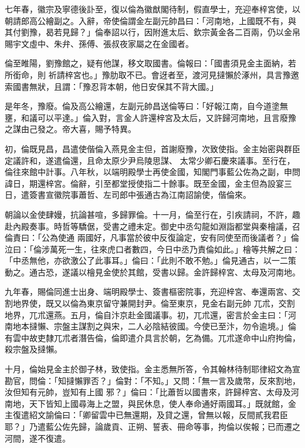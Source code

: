 \begin{pinyinscope}
 七年春，徽宗及寧德後訃至，復以倫為徽猷閣待制，假直學士，充迎奉梓宮使，以朝請郎高公繪副之。入辭，帝使倫謂金左副元帥昌曰：「河南地，上國既不有，與其付劉豫，曷若見歸？」倫奉詔以行，因附進太后、欽宗黃金各二百兩，仍以金帛賜宇文虛中、朱弁、孫傅、張叔夜家屬之在金國者。



 倫至睢陽，劉豫館之，疑有他謀，移文取國書。倫報曰：「國書須見金主面納，若所銜命，則
 祈請梓宮也。」豫肋取不已。會迓者至，渡河見撻懶於涿州，具言豫邀索國書無狀，且謂：「豫忍背本朝，他日安保其不背大國。」



 是年冬，豫廢。倫及高公繪還，左副元帥昌送倫等曰：「好報江南，自今道塗無壅，和議可以平達。」倫入對，言金人許還梓宮及太后，又許歸河南地，且言廢豫之謀由己發之。帝大喜，賜予特異。



 初，倫既見昌，昌遣使偕倫入燕見金主但，首謝廢豫，次致使指。金主始密與群臣定議許和，遂遣倫還，且命太原少尹烏陵思謀、
 太常少卿石慶來議事。至行在，倫往來館中計事。八年秋，以端明殿學士再使金國，知閣門事藍公佐為之副，申問諱日，期還梓宮。倫辭，引至都堂授使指二十餘事。既至金國，金主但為設宴三日，遣簽書宣徽院事蕭哲、左司郎中張通古為江南詔諭使，偕倫來。



 朝論以金使肆嫚，抗論甚喧，多歸罪倫。十一月，倫至行在，引疾請祠，不許，趣赴內殿奏事。時哲等驕倨，受書之禮未定。御史中丞勾龍如淵詣都堂與秦檜議，召倫責曰：「公為使通
 兩國好，凡事當於彼中反復論定，安有同使至而後議者？」倫泣曰：「倫涉萬死一生，往來虎口者數四，今日中丞乃責倫如此。」檜等共解之曰：「中丞無他，亦欲激公了此事耳。」倫曰：「此則不敢不勉。」倫見通古，以一二策動之。通古恐，遂議以檜見金使於其館，受書以歸。金許歸梓宮、太母及河南地。



 九年春，賜倫同進士出身、端明殿學士、簽書樞密院事，充迎梓宮、奉還兩宮、交割地界使，既又以倫為東京留守兼開封尹。倫至東京，見金右副元帥
 兀朮，交割地界，兀朮還燕。五月，倫自汴京赴金國議事。初，兀朮還，密言於金主曰：「河南地本撻懶、宗盤主謀割之與宋，二人必陰結彼國。今使已至汴，勿令逾境。」倫有雲中故吏隸兀朮者潛告倫，倫即遣介具言於朝，乞為備。兀朮遂命中山府拘倫，殺宗盤及撻懶。



 十月，倫始見金主於御子林，致使指。金主悉無所答，令其翰林待制耶律紹文為宣勘官，問倫：「知撻懶罪否？」倫對：「不知。」又問：「無一言及歲幣，反來割地，汝但知有元帥，豈知有上國
 邪？」倫曰：「比蕭哲以國書來，許歸梓宮、太母及河南地，天下皆知上國尋海上之盟，與民休息，使人奉命通好兩國耳。」既就館，金主復遣紹文諭倫曰：「卿留雲中已無還期，及貸之還，曾無以報，反間貳我君臣耶？」乃遣藍公佐先歸，論歲貢、正朔、誓表、冊命等事，拘倫以俟報；已而遷之河間，遂不復遣。




\end{pinyinscope}
